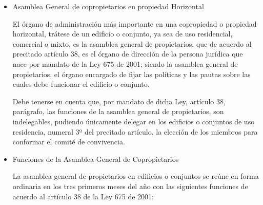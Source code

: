 \begin{itemize}
\item Asamblea General de copropietarios en propiedad Horizontal

El órgano de administración más importante en una copropiedad o propiedad horizontal, trátese de un edificio o conjunto, ya sea de uso residencial, comercial o mixto, es la 
asamblea general de propietarios, que de acuerdo al precitado artículo 38, es el órgano de dirección de la persona jurídica que nace por mandato de la Ley 675 de 2001; siendo la asamblea general de propietarios, el órgano encargado de fijar las políticas y  las pautas sobre las cuales debe  funcionar el edificio o conjunto.

Debe tenerse en cuenta que, por mandato de dicha Ley, artículo 38, parágrafo, las funciones de la asamblea general de propietarios, son indelegables, pudiendo únicamente delegar en los edificios o conjuntos de uso residencia, numeral 3º del precitado artículo, la elección de los miembros para conformar el comité de convivencia.

\item Funciones de la Asamblea General de Copropietarios

La asamblea general de propietarios en edificios o conjuntos se reúne en forma ordinaria en los tres primeros meses del año con las siguientes funciones de acuerdo al artículo 38 de la Ley 675 de 2001:
\begin{itemize}


\end{itemize}
\end{itemize}
